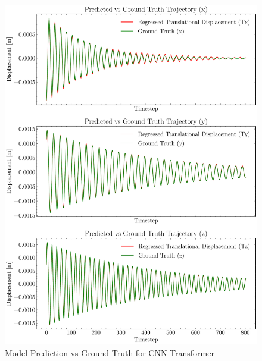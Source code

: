\begin{figure}[H]
    \centering
    \includegraphics[scale=0.55]{images/fig_chapter4/nn_related/predicted_vs_ground_truth_transformer.pdf}
    \caption{Model Prediction vs Ground Truth for CNN-Transformer}
    \label{fig:cnn_trans_op_vs_gt}
\end{figure}

